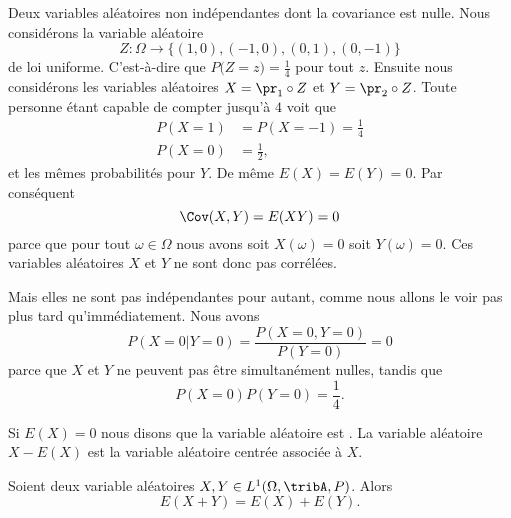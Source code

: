 \begin{example} \label{ExWLzkuWd}
	Deux variables aléatoires non indépendantes dont la covariance est nulle. Nous considérons la variable aléatoire
	\begin{equation}
		Z\colon \Omega\to \{ (1,0),(-1,0),(0,1),(0,-1) \}
	\end{equation}
	de loi uniforme. C'est-à-dire que \(  P\big( Z=z \big)=\frac{1}{ 4 }  \) pour tout \( z\). Ensuite nous considérons les variables aléatoires \( X=\pr_1\circ Z\) et \( Y=\pr_2\circ Z\). Toute personne étant capable de compter jusqu'à \( 4\) voit que
	\begin{subequations}
		\begin{align}
			P(X=1) & =P(X=-1)=\frac{1}{ 4 } \\
			P(X=0) & =\frac{ 1 }{2},
		\end{align}
	\end{subequations}
	et les mêmes probabilités pour \( Y\). De même \( E(X)=E(Y)=0\). Par conséquent
	\begin{equation}
		\Cov(X,Y)=E(XY)=0
	\end{equation}
	parce que pour tout \( \omega\in \Omega\) nous avons soit \( X(\omega)=0\) soit \( Y(\omega)=0\). Ces variables aléatoires \( X\) et \( Y\) ne sont donc pas corrélées.

	Mais elles ne sont pas indépendantes pour autant, comme nous allons le voir pas plus tard qu'immédiatement. Nous avons
	\begin{equation}
		P(X=0|Y=0)=\frac{ P(X=0,Y=0) }{ P(Y=0) }=0
	\end{equation}
	parce que \( X\) et \( Y\) ne peuvent pas être simultanément nulles, tandis que
	\begin{equation}
		P(X=0)P(Y=0)=\frac{1}{ 4 }.
	\end{equation}
\end{example}

\begin{definition}
	Si \( E(X)=0\) nous disons que la variable aléatoire est . La variable aléatoire \( X-E(X)\) est la variable aléatoire centrée associée à \( X\).
\end{definition}

\begin{proposition} \label{PropZBnsCgh}
	Soient deux variable aléatoires \( X,Y\in L^1(\Omega,\tribA, P)\). Alors
	\begin{equation}
		E(X+Y)=E(X)+E(Y).
	\end{equation}
\end{proposition}

